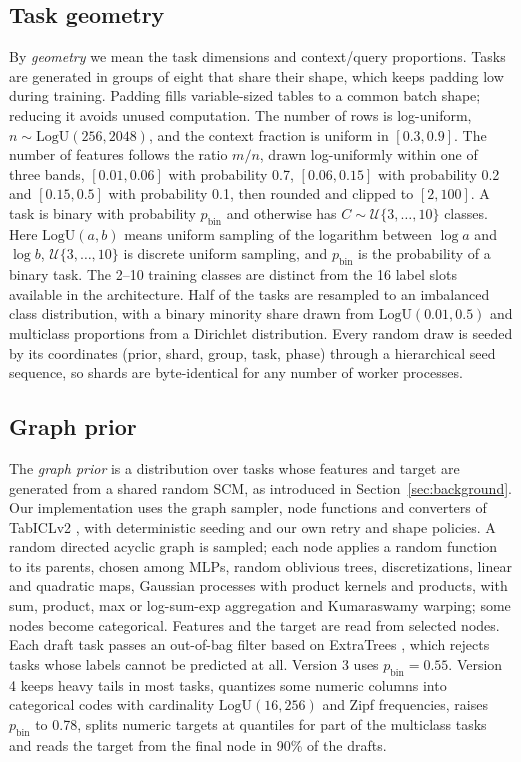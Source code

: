 \documentclass[11pt]{article}
\begin{document}
\subsection{Task geometry}
By \emph{geometry} we mean the task dimensions and context/query proportions.
Tasks are generated in groups of eight that share their shape, which keeps padding low during
training. Padding fills variable-sized tables to a common batch shape; reducing it avoids unused
computation. The number of rows is log-uniform, $n\sim\mathrm{LogU}(256,2048)$, and the context
fraction is uniform in $[0.3,0.9]$. The number of features follows the ratio $m/n$, drawn
log-uniformly within one of three bands, $[0.01,0.06]$ with probability 0.7, $[0.06,0.15]$ with
probability 0.2 and $[0.15,0.5]$ with probability 0.1, then rounded and clipped to $[2,100]$. A task
is binary with probability $p_{\mathrm{bin}}$ and otherwise has $C\sim\mathcal{U}\{3,\dots,10\}$
classes. Here $\mathrm{LogU}(a,b)$ means uniform sampling of the logarithm between $\log a$ and
$\log b$, $\mathcal{U}\{3,\dots,10\}$ is discrete uniform sampling, and $p_{\mathrm{bin}}$ is the
probability of a binary task. The 2--10 training classes are distinct from the 16 label slots
available in the architecture. Half of the tasks are resampled to an imbalanced class distribution, with a binary
minority share drawn from $\mathrm{LogU}(0.01,0.5)$ and multiclass proportions from a Dirichlet
distribution. Every random draw is seeded by its coordinates (prior, shard, group, task, phase) through a
hierarchical seed sequence, so shards are byte-identical for any number of worker processes.

\subsection{Graph prior}
The \emph{graph prior} is a distribution over tasks whose features and target are generated from
a shared random SCM, as introduced in Section~\ref{sec:background}.
Our implementation uses the graph sampler, node functions and converters of TabICLv2
\cite{tabiclv2}, with deterministic seeding and our own retry and shape policies.
A random directed acyclic graph is sampled; each node applies a random function to its parents,
chosen among MLPs, random oblivious trees, discretizations, linear and quadratic maps, Gaussian
processes with product kernels and products, with sum, product, max or log-sum-exp aggregation and
Kumaraswamy warping; some nodes become categorical. Features and the target are read from selected
nodes. Each draft task passes an out-of-bag filter based on ExtraTrees \cite{geurts2006}, which
rejects tasks whose labels cannot be predicted at all. Version 3 uses $p_{\mathrm{bin}}=0.55$.
Version 4 keeps heavy tails in most tasks, quantizes some numeric columns into categorical codes
with cardinality $\mathrm{LogU}(16,256)$ and Zipf frequencies, raises $p_{\mathrm{bin}}$ to 0.78,
splits numeric targets at quantiles for part of the multiclass tasks and reads the target from the
final node in 90\% of the drafts.
\end{document}
